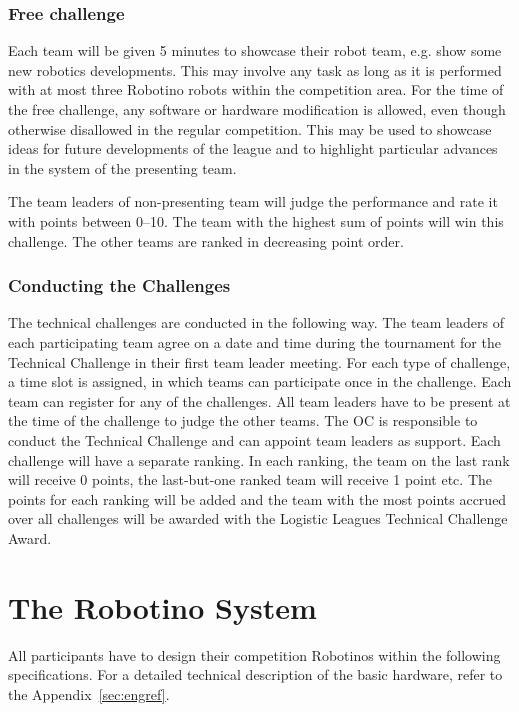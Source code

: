 \documentclass[12pt,twoside]{article}
\begin{document}
\subsubsection{Free challenge~}
Each team will be given 5 minutes to showcase their robot team, e.g.
show some new robotics developments. This may involve any task as long
as it is performed with at most three Robotino robots within the
competition area. For the time of the free challenge, any software or
hardware modification is allowed, even though otherwise disallowed in
the regular competition. This may be used to showcase ideas for future
developments of the league and to highlight particular advances in the
system of the presenting team.

The team leaders of non-presenting team will judge the performance and
rate it with points between 0--10.  The team with the highest sum of
points will win this challenge. The other teams are ranked in
decreasing point order.

\subsubsection{Conducting the Challenges~}
The technical challenges are conducted in the following way. The team
leaders of each participating team agree on a date and time during the
tournament for the Technical Challenge in their first team leader
meeting. For each type of challenge, a time slot is assigned, in which
teams can participate once in the challenge. Each team can register
for any of the challenges. All team leaders have to be present at the
time of the challenge to judge the other teams. The OC is responsible
to conduct the Technical Challenge and can appoint team leaders as
support. Each challenge will have a separate ranking. In each ranking,
the team on the last rank will receive 0 points, the last-but-one
ranked team will receive 1 point etc. The points for each ranking will
be added and the team with the most points accrued over all challenges
will be awarded with the Logistic Leagues Technical Challenge Award.


\section{The Robotino System}
\label{sec:robotino}

All participants have to design their competition Robotinos within the
following specifications. For a detailed technical description of the
basic hardware, refer to the Appendix~\ref{sec:engref}.
\end{document}
